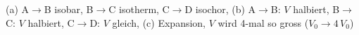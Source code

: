 (a) A$\to$B isobar, B$\to$C isotherm, C$\to$D isochor, (b) A$\to$B: $V$ halbiert, B$\to$C: $V$ halbiert, C$\to$D: $V$ gleich, (c) Expansion, $V$ wird 4-mal so gross ($V_0 \to 4\,V_0$)
